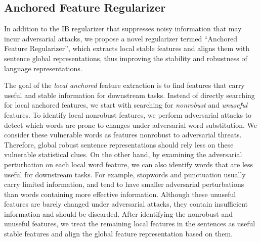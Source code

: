\documentclass{article} \usepackage{iclr2021_conference,times}
\theoremstyle{definition}
\theoremstyle{remark}
\begin{document}
\subsection{Anchored Feature Regularizer}
In addition to the IB regularizer that suppresses noisy information that may incur adversarial attacks, we propose a novel regularizer termed  ``Anchored Feature Regularizer'', which extracts local stable features and aligns them with sentence global representations, thus improving the stability and robustness of language representations.  

The goal of the \textit{local anchored} feature extraction is to find features that carry useful and stable information for downstream tasks. Instead of directly searching for local anchored features, we start with searching for \textit{nonrobust} and \textit{unuseful} features. To identify local nonrobust features, we perform adversarial attacks to detect which words are prone to changes under adversarial word substitution. We consider these vulnerable words as features nonrobust to adversarial threats. Therefore, global robust sentence representations should rely less on these vulnerable statistical clues. On the other hand, by examining the adversarial perturbation on each local word feature, we can also identify words that are less useful for downstream tasks. For example, stopwords and punctuation usually carry limited information, and tend to have smaller adversarial perturbations than words containing more effective information. Although these unuseful features are barely changed under adversarial attacks, they contain insufficient information and should be discarded. After identifying the nonrobust and unuseful features, we treat the remaining local features in the sentences as useful stable features and align the global feature representation based on them. 
\end{document}
